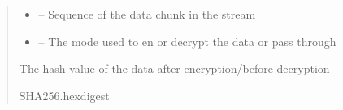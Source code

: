 \documentclass[letterpaper,10pt,english]{sphinxmanual}
\begin{document}
\begin{savenotes}
\begin{fulllineitems}
\begin{savenotes}
\begin{fulllineitems}
\begin{quote}
\begin{description}
\begin{itemize}
\item {} 
\sphinxAtStartPar
{} – Sequence of the data chunk in the stream

\item {} 
\sphinxAtStartPar
{} – The mode used to en\sphinxhyphen{} or decrypt the data or pass through

\end{itemize}

\sphinxAtStartPar
The hash value of the data after encryption/before decryption

\sphinxAtStartPar
SHA256.hexdigest

\end{description}\end{quote}

\end{fulllineitems}\end{savenotes}


\end{fulllineitems}\end{savenotes}

\end{document}
